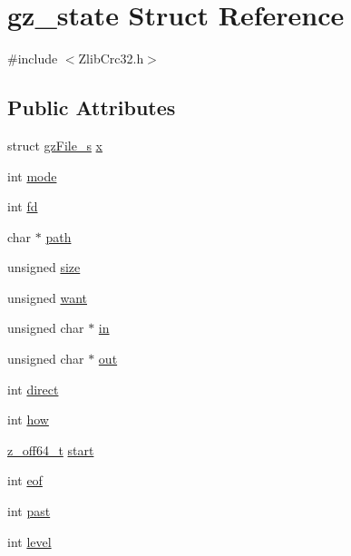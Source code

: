 \hypertarget{structgz__state}{}\section{gz\+\_\+state Struct Reference}
\label{structgz__state}


{\ttfamily \#include $<$Zlib\+Crc32.\+h$>$}

\subsection*{Public Attributes}
\begin{DoxyCompactItemize}
\item 
struct \mbox{\hyperlink{structgzFile__s}{gz\+File\+\_\+s}} \mbox{\hyperlink{structgz__state_a92b9a7b77e0b6a494275d8bf0f0f3274}{x}}
\item 
int \mbox{\hyperlink{structgz__state_aaded3d8b2702b1bfabe3141e6f772b1a}{mode}}
\item 
int \mbox{\hyperlink{structgz__state_a5963abca9e640ff2aa40b517f9cffc2c}{fd}}
\item 
char $\ast$ \mbox{\hyperlink{structgz__state_ad52b106362f7262800d7224ff90fdd16}{path}}
\item 
unsigned \mbox{\hyperlink{structgz__state_a36b86ed64aca8f022ec0f3411663fe24}{size}}
\item 
unsigned \mbox{\hyperlink{structgz__state_abee992fb115f9f118377b9f46d14b2a5}{want}}
\item 
unsigned char $\ast$ \mbox{\hyperlink{structgz__state_af16c5730c48518809ead34557d612942}{in}}
\item 
unsigned char $\ast$ \mbox{\hyperlink{structgz__state_ad83d10502587255806fd712109867106}{out}}
\item 
int \mbox{\hyperlink{structgz__state_a114c6a0de43039853ead48a092792a7d}{direct}}
\item 
int \mbox{\hyperlink{structgz__state_ac6e4b7db699aacd089f6d55b01483d6f}{how}}
\item 
\mbox{\hyperlink{ZlibCrc32_8h_ab9923767082c7a76924b31493e60d42c}{z\+\_\+off64\+\_\+t}} \mbox{\hyperlink{structgz__state_a0eb95c1935a32c508a1e6fc1e84c8f83}{start}}
\item 
int \mbox{\hyperlink{structgz__state_ae50ffc823858bc4f909e3d9507356f92}{eof}}
\item 
int \mbox{\hyperlink{structgz__state_a65b39b950d5cabf4c174924c922aa3ff}{past}}
\item 
int \mbox{\hyperlink{structgz__state_aaf5e13a32b8618cde112e4312d480137}{level}}

\end{DoxyCompactItemize}
